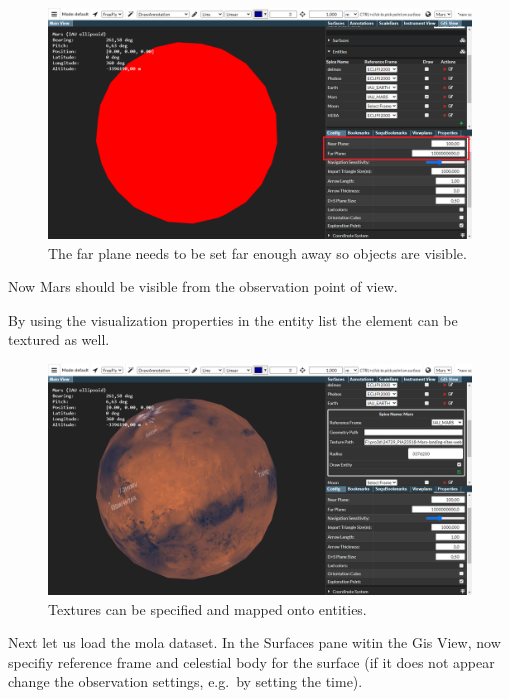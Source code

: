 \begin{figure}[h!]
	\centering
	\includegraphics[width=1\textwidth]{./pics/farplane.png}
	\caption{The far plane needs to be set far enough away so objects are visible.}
\end{figure}

Now Mars should be visible from the observation point of view.

By using the visualization properties in the entity list the element can
be textured as well.

\begin{figure}[h!]
	\centering
	\includegraphics[width=1\textwidth]{./pics/textured.png}
	\caption{Textures can be specified and mapped onto entities.}
\end{figure}

Next let us load the mola dataset. In the Surfaces pane witin the Gis
View, now specifiy reference frame and celestial body for the surface
(if it does not appear change the observation settings, e.g.~by setting
the time).

